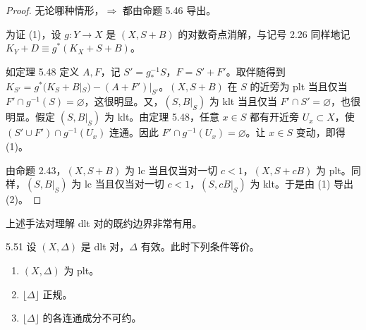 \begin{proof}
无论哪种情形，$\Rightarrow$ 都由命题 5.46 导出。

为证 (1)，设 $g\colon Y\to X$ 是 $(X,S+B)$ 的对数奇点消解，与记号 2.26 同样地记 $K_Y+D\equiv g^*(K_X+S+B)$。

如定理 5.48 定义 $A,F$，记 $S'=g^{-1}_*S$，$F=S'+F'$。取伴随得到 $K_{S'}=g^*(K_S+B|_S)-(A+F')|_{S'}$。$(X,S+B)$ 在 $S$ 的近旁为 plt 当且仅当 $F'\cap g^{-1}(S)=\varnothing$，这很明显。又，$(S,B|_S)$ 为 klt 当且仅当 $F'\cap S'=\varnothing$，也很明显。假定 $(S,B|_S)$ 为 klt。由定理 5.48，任意 $x\in S$ 都有开近旁 $U_x\subset X$，使 $(S'\cup F')\cap g^{-1}(U_x)$ 连通。因此 $F'\cap g^{-1}(U_x)=\varnothing$。让 $x\in S$ 变动，即得 (1)。

由命题 2.43，$(X,S+B)$ 为 lc 当且仅当对一切 $c<1$，$(X,S+cB)$ 为 plt。同样，$(S,B|_S)$ 为 lc 当且仅当对一切 $c<1$，$(S,cB|_S)$ 为 klt。于是由 (1) 导出 (2)。
\end{proof}

上述手法对理解 dlt 对的既约边界非常有用。

\begin{propositionp}{5.51}
设 $(X,\Delta)$ 是 dlt 对，$\Delta$ 有效。此时下列条件等价。
\begin{enumerate}[label=(\arabic*),leftmargin=*]
\item $(X,\Delta)$ 为 plt。
\item $\lfloor\Delta\rfloor$ 正规。
\item $\lfloor\Delta\rfloor$ 的各连通成分不可约。
\end{enumerate}
\end{propositionp}

